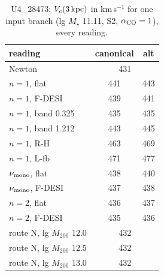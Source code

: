 \begin{table}[h]\centering\small\caption{U4\_28473: $V_c(3\,{\rm kpc})$ in km\,s$^{-1}$ for one input branch (lg $M_\star$ 11.11, S2, $\alpha_{\rm CO}=1$), every reading.}\label{t:read}\begin{tabular}{lcc}\toprule
reading & canonical & alt \\ \midrule
Newton & \multicolumn{2}{c}{431} \\
$n=1$, flat & 441 & 443 \\
$n=1$, F-DESI & 439 & 441 \\
$n=1$, band 0.325 & 435 & 435 \\
$n=1$, band 1.212 & 443 & 445 \\
$n=1$, R-H & 463 & 469 \\
$n=1$, L-fb & 471 & 477 \\
$\nu_{\rm mono}$, flat & 438 & 440 \\
$\nu_{\rm mono}$, F-DESI & 437 & 438 \\
$n=2$, flat & 436 & 437 \\
$n=2$, F-DESI & 435 & 436 \\
route N, lg $M_{200}$ 12.0 & \multicolumn{2}{c}{432} \\
route N, lg $M_{200}$ 12.5 & \multicolumn{2}{c}{432} \\
route N, lg $M_{200}$ 13.0 & \multicolumn{2}{c}{432} \\
\bottomrule\end{tabular}\end{table}
